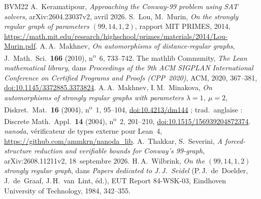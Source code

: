 \documentclass[11pt,a4paper]{article}
\theoremstyle{remark}
\begin{document}
{\begin{thebibliography}{BVM22}
 A.~Keramatipour, \emph{Approaching the Conway-99 problem using SAT solvers}, arXiv:2604.23037v2, avril 2026.
 S.~Lou, M.~Murin, \emph{On the strongly regular graph of parameters $(99,14,1,2)$}, rapport MIT PRIMES,
2014, \url{https://math.mit.edu/research/highschool/primes/materials/2014/Lou-Murin.pdf}.
 A.\,A.~Makhnev, \emph{On automorphisms of distance-regular graphs}, J.\ Math.\ Sci.\ \textbf{166} (2010),
n\textsuperscript{o}~6, 733--742.
 The mathlib Community, \emph{The Lean mathematical library}, dans \emph{Proceedings of the 9th ACM SIGPLAN
International Conference on Certified Programs and Proofs (CPP~2020)}, ACM, 2020, 367--381,
\href{https://doi.org/10.1145/3372885.3373824}{doi:10.1145/3372885.3373824}.
 A.\,A.~Makhnev, I.\,M.~Minakova, \emph{On automorphisms of strongly regular graphs with parameters
$\lambda=1$, $\mu=2$}, Diskret.\ Mat.\ \textbf{16} (2004), n\textsuperscript{o}~1, 95--104,
\href{https://doi.org/10.4213/dm144}{doi:10.4213/dm144} ; trad.\ anglaise : Discrete Math.\ Appl.\ \textbf{14} (2004),
n\textsuperscript{o}~2, 201--210, \href{https://doi.org/10.1515/156939204872374}{doi:10.1515/156939204872374}.
 \emph{nanoda}, vérificateur de types externe pour Lean~4, \url{https://github.com/ammkrn/nanoda_lib}.
 A.~Thakkar, S.~Severini, \emph{A forced-structure reduction and verifiable bounds for Conway's 99-graph},
arXiv:2608.11211v2, 18~septembre 2026.
 H.\,A.~Wilbrink, \emph{On the $(99,14,1,2)$ strongly regular graph}, dans \emph{Papers dedicated to
J.\,J.~Seidel} (P.\,J.~de~Doelder, J.~de~Graaf, J.\,H.~van~Lint, éd.), EUT Report 84-WSK-03, Eindhoven University of
Technology, 1984, 342--355.
\end{thebibliography}
}
\end{document}
